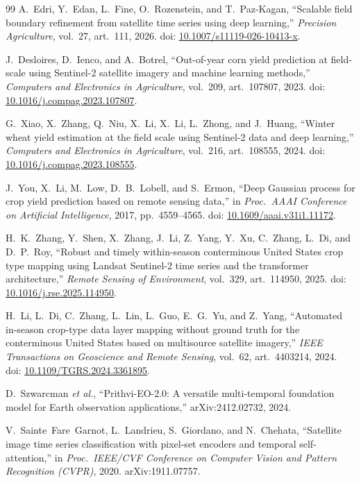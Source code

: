 \begin{thebibliography}{99}
A.~Edri, Y.~Edan, L.~Fine, O.~Rozenstein, and T.~Paz-Kagan, ``Scalable field boundary refinement from
satellite time series using deep learning,'' \textit{Precision Agriculture}, vol.~27, art.~111, 2026.
doi: \href{https://doi.org/10.1007/s11119-026-10413-x}{10.1007/s11119-026-10413-x}.

J.~Desloires, D.~Ienco, and A.~Botrel, ``Out-of-year corn yield prediction at field-scale using
Sentinel-2 satellite imagery and machine learning methods,'' \textit{Computers and Electronics in
Agriculture}, vol.~209, art.~107807, 2023.
doi: \href{https://doi.org/10.1016/j.compag.2023.107807}{10.1016/j.compag.2023.107807}.

G.~Xiao, X.~Zhang, Q.~Niu, X.~Li, X.~Li, L.~Zhong, and J.~Huang, ``Winter wheat yield estimation at the
field scale using Sentinel-2 data and deep learning,'' \textit{Computers and Electronics in
Agriculture}, vol.~216, art.~108555, 2024.
doi: \href{https://doi.org/10.1016/j.compag.2023.108555}{10.1016/j.compag.2023.108555}.

J.~You, X.~Li, M.~Low, D.~B.~Lobell, and S.~Ermon, ``Deep Gaussian process for crop yield prediction
based on remote sensing data,'' in \textit{Proc.\ AAAI Conference on Artificial Intelligence}, 2017,
pp.~4559--4565. doi: \href{https://doi.org/10.1609/aaai.v31i1.11172}{10.1609/aaai.v31i1.11172}.

H.~K.~Zhang, Y.~Shen, X.~Zhang, J.~Li, Z.~Yang, Y.~Xu, C.~Zhang, L.~Di, and D.~P.~Roy, ``Robust and
timely within-season conterminous United States crop type mapping using Landsat Sentinel-2 time
series and the transformer architecture,'' \textit{Remote Sensing of Environment}, vol.~329,
art.~114950, 2025. doi: \href{https://doi.org/10.1016/j.rse.2025.114950}{10.1016/j.rse.2025.114950}.

H.~Li, L.~Di, C.~Zhang, L.~Lin, L.~Guo, E.~G.~Yu, and Z.~Yang, ``Automated in-season crop-type data
layer mapping without ground truth for the conterminous United States based on multisource satellite
imagery,'' \textit{IEEE Transactions on Geoscience and Remote Sensing}, vol.~62, art.~4403214, 2024.
doi: \href{https://doi.org/10.1109/TGRS.2024.3361895}{10.1109/TGRS.2024.3361895}.

D.~Szwarcman \textit{et al.}, ``Prithvi-EO-2.0: A versatile multi-temporal foundation model for Earth
observation applications,'' arXiv:2412.02732, 2024.

V.~Sainte~Fare~Garnot, L.~Landrieu, S.~Giordano, and N.~Chehata, ``Satellite image time series
classification with pixel-set encoders and temporal self-attention,'' in \textit{Proc.\ IEEE/CVF
Conference on Computer Vision and Pattern Recognition (CVPR)}, 2020. arXiv:1911.07757.


\end{thebibliography}
